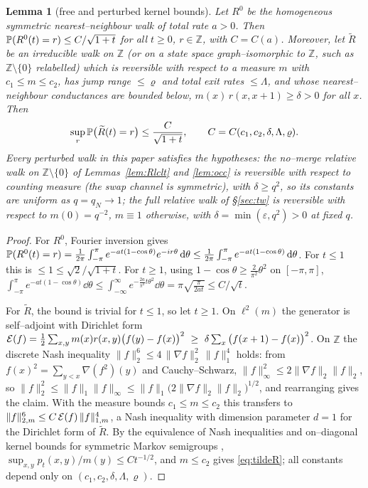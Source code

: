 \documentclass[11pt]{article}
\theoremstyle{plain}
\newtheorem{lemma}[theorem]{Lemma}
\theoremstyle{definition}
\theoremstyle{remark}
\newcommand{\Z}{\mathbb{Z}}\newcommand{\R}{\mathbb{R}}\newcommand{\N}{\mathbb{N}}
\newcommand{\eps}{\varepsilon}\newcommand{\Exp}{\mathrm{Exp}}
\begin{document}
\begin{lemma}[free and perturbed kernel bounds]\label{lem:free}
Let $R^0$ be the homogeneous symmetric nearest--neighbour walk of total rate $a>0$.
Then $\mathbb{P}(R^0(t)=r)\le C/\sqrt{1+t}$ for all $t\ge0$, $r\in\Z$, with $C=C(a)$.
Moreover, let $\widetilde R$ be an irreducible walk on $\Z$ (or on a state space
graph--isomorphic to $\Z$, such as $\Z\setminus\{0\}$ relabelled) which is
\emph{reversible} with respect to a measure $m$ with $c_1\le m\le c_2$, has jump range
$\le\varrho$ and total exit rates $\le\Lambda$, and whose nearest--neighbour
conductances are bounded below, $m(x)\,r(x,x+1)\ge\delta>0$ for all $x$. Then
\begin{equation}\label{eq:tildeR}
  \sup_{r}\mathbb{P}\big(\widetilde R(t)=r\big)\le \frac{C}{\sqrt{1+t}},
  \qquad C=C(c_1,c_2,\delta,\Lambda,\varrho).
\end{equation}
Every perturbed walk in this paper satisfies the hypotheses: the no--merge relative
walk on $\Z\setminus\{0\}$ of Lemmas~\ref{lem:Rlclt} and \ref{lem:occ} is reversible
with respect to counting measure (the swap channel is symmetric), with $\delta\ge
q^2$, so its constants are uniform as $q=q_N\to1$; the full relative walk of
\S\ref{sec:tw} is reversible with respect to $m(0)=q^{-2}$, $m\equiv1$ otherwise, with
$\delta=\min(\eps,q^2)>0$ at fixed $q$.
\end{lemma}
\begin{proof}
For $R^0$, Fourier inversion gives
$\mathbb{P}(R^0(t)=r)=\frac1{2\pi}\int_{-\pi}^\pi e^{-a t(1-\cos\theta)}e^{-ir\theta}\,\mathrm{d}\theta
\le\frac1{2\pi}\int_{-\pi}^\pi e^{-at(1-\cos\theta)}\,\mathrm{d}\theta$. For $t\le1$ this is
$\le1\le\sqrt2/\sqrt{1+t}$. For $t\ge1$, using $1-\cos\theta\ge\frac{2}{\pi^2}\theta^2$
on $[-\pi,\pi]$,
$\int_{-\pi}^\pi e^{-at(1-\cos\theta)}\dd\theta\le\int_{-\infty}^\infty
e^{-\frac{2a}{\pi^2}t\theta^2}\dd\theta=\pi\sqrt{\tfrac{\pi}{2at}}\le C/\sqrt t$.

For $\widetilde R$, the bound is trivial for $t\le1$, so let $t\ge1$. On $\ell^2(m)$
the generator is self--adjoint with Dirichlet form
$\mathcal E(f)=\tfrac12\sum_{x,y}m(x)r(x,y)\big(f(y)-f(x)\big)^2
\ \ge\ \delta\sum_x\big(f(x+1)-f(x)\big)^2$. On $\Z$ the discrete Nash inequality
$\|f\|_2^6\le4\,\|\nabla f\|_2^2\,\|f\|_1^4$ holds: from
$f(x)^2=\sum_{y<x}\nabla(f^2)(y)$ and Cauchy--Schwarz,
$\|f\|_\infty^2\le2\|\nabla f\|_2\|f\|_2$, so
$\|f\|_2^2\le\|f\|_1\|f\|_\infty\le\|f\|_1\big(2\|\nabla f\|_2\|f\|_2\big)^{1/2}$,
and rearranging gives the claim. With the measure bounds $c_1\le m\le c_2$ this
transfers to $\|f\|_{2,m}^6\le C\,\mathcal E(f)\,\|f\|_{1,m}^4$, a Nash inequality with
dimension parameter $d=1$ for the Dirichlet form of $\widetilde R$. By the
equivalence of Nash inequalities and on--diagonal kernel bounds for symmetric Markov
semigroups \cite{CKS}, $\sup_{x,y}p_t(x,y)/m(y)\le Ct^{-1/2}$, and $m\le c_2$ gives
\eqref{eq:tildeR}; all constants depend only on $(c_1,c_2,\delta,\Lambda,\varrho)$.
\end{proof}
\end{document}
